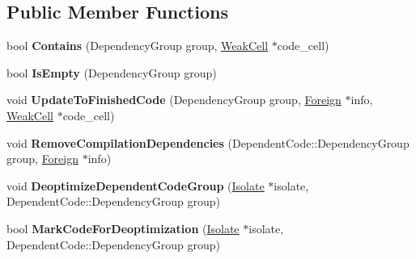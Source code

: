 \subsection*{Public Member Functions}
\begin{DoxyCompactItemize}
\item 
bool {\bfseries Contains} (Dependency\+Group group, \hyperlink{classv8_1_1internal_1_1_weak_cell}{Weak\+Cell} $\ast$code\+\_\+cell)\hypertarget{classv8_1_1internal_1_1_dependent_code_ae1701a0cf26b27b5438b893cf39da1a3}{}\label{classv8_1_1internal_1_1_dependent_code_ae1701a0cf26b27b5438b893cf39da1a3}

\item 
bool {\bfseries Is\+Empty} (Dependency\+Group group)\hypertarget{classv8_1_1internal_1_1_dependent_code_aaf23252cca2053cef9a13c55f3303693}{}\label{classv8_1_1internal_1_1_dependent_code_aaf23252cca2053cef9a13c55f3303693}

\item 
void {\bfseries Update\+To\+Finished\+Code} (Dependency\+Group group, \hyperlink{classv8_1_1internal_1_1_foreign}{Foreign} $\ast$info, \hyperlink{classv8_1_1internal_1_1_weak_cell}{Weak\+Cell} $\ast$code\+\_\+cell)\hypertarget{classv8_1_1internal_1_1_dependent_code_ad8d28c58a4cfc662403ca7304b4ba929}{}\label{classv8_1_1internal_1_1_dependent_code_ad8d28c58a4cfc662403ca7304b4ba929}

\item 
void {\bfseries Remove\+Compilation\+Dependencies} (Dependent\+Code\+::\+Dependency\+Group group, \hyperlink{classv8_1_1internal_1_1_foreign}{Foreign} $\ast$info)\hypertarget{classv8_1_1internal_1_1_dependent_code_a6d69584398c2ef584e0b30feda9f91e7}{}\label{classv8_1_1internal_1_1_dependent_code_a6d69584398c2ef584e0b30feda9f91e7}

\item 
void {\bfseries Deoptimize\+Dependent\+Code\+Group} (\hyperlink{classv8_1_1internal_1_1_isolate}{Isolate} $\ast$isolate, Dependent\+Code\+::\+Dependency\+Group group)\hypertarget{classv8_1_1internal_1_1_dependent_code_a7b464250df1b523af5da5685b0f403ec}{}\label{classv8_1_1internal_1_1_dependent_code_a7b464250df1b523af5da5685b0f403ec}

\item 
bool {\bfseries Mark\+Code\+For\+Deoptimization} (\hyperlink{classv8_1_1internal_1_1_isolate}{Isolate} $\ast$isolate, Dependent\+Code\+::\+Dependency\+Group group)\hypertarget{classv8_1_1internal_1_1_dependent_code_a4b3a68aba1af3c6ea427ec412fa606ab}{}\label{classv8_1_1internal_1_1_dependent_code_a4b3a68aba1af3c6ea427ec412fa606ab}


\end{DoxyCompactItemize}
